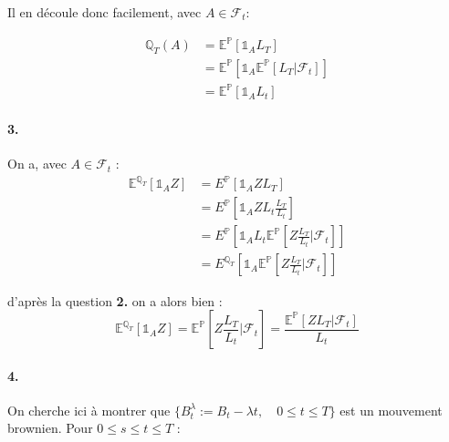 \documentclass[a4paper,10pt]{report}
\begin{document}
Il en découle donc facilement, avec $A \in \mathcal{F}_t$:

$$
\begin{aligned}
\mathbb{Q}_{T}(A) &=\mathbb{E}^{\mathbb{P}}\left[\mathds{1}_{A} L_{T}\right] \\
&=\mathbb{E}^{\mathbb{P}}\left[\mathds{1}_{A} \mathbb{E}^{\mathbb{P}}\left[L_{T} | \mathcal{F}_{t}\right]\right] \\
&=\mathbb{E}^{\mathbb{P}}\left[\mathds{1}_{A} L_{t}\right]
\end{aligned}
$$


\paragraph{3.} On a, avec $A \in \mathcal{F}_{t}$ :
$$
\begin{aligned}
\mathbb{E}^{\mathbb{Q}_{T}}\left[\mathds{1}_A Z\right] &=E^{\mathbb{P}}\left[\mathds{1}_A Z L_T\right] \\
&=E^{\mathbb{P}}\left[\mathds{1}_A Z L_t \frac{L_T}{L_t}\right] \\
&=E^{\mathbb{P}}\left[\mathds{1}_A L_t \mathbb{E}^{\mathbb{P}}\left[Z \frac{L_T}{L_t} | \mathcal{F}_t\right]\right] \\
&=E^{\mathbb{Q}_T}\left[\mathds{1}_A \mathbb{E}^{\mathbb{P}}\left[Z \frac{L_T}{L_t} | \mathcal{F}_t\right]\right]
\end{aligned}
$$

d'après la question \textbf{2.} on a alors bien :
$$
\mathbb{E}^{\mathbb{Q}_T}\left[\mathds{1}_A Z\right] = \mathbb{E}^{\mathbb{P}}\left[Z \frac{L_T}{L_t} | \mathcal{F}_t\right] = \frac{\mathbb{E}^{\mathbb{P}}\left[Z L_T | \mathcal{F}_t\right]}{L_t}
$$


\paragraph{4.} On cherche ici à montrer que $\{B^{\lambda}_t :=B_t - \lambda t , \quad 0 \leq t \leq T \}$ est un mouvement brownien. Pour $0 \leq s \leq t \leq T$ :
\end{document}
